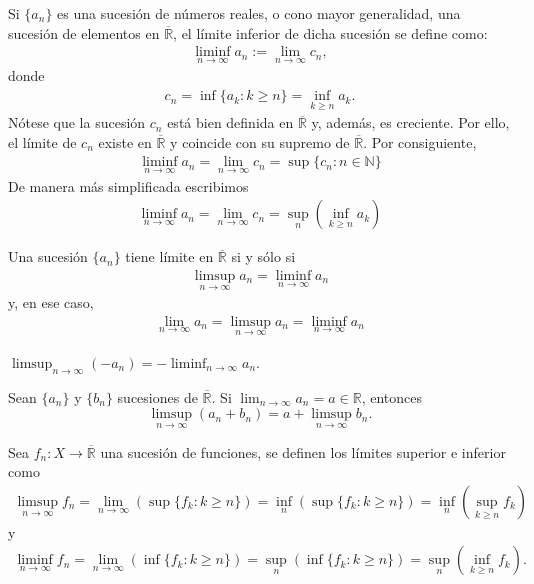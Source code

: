 \begin{defi}
    Si $\{a_n\}$ es una sucesión de números reales, o cono mayor generalidad, una sucesión de elementos en $\overline{\mathbb{R}}$, el límite inferior de dicha sucesión se define como:
    \begin{align*}
        \liminf_{n \to \infty}{a_n} := \lim_{n \to \infty}{c_n},
    \end{align*}
    donde
    \begin{align*}
        c_n = \inf{\{ a_k : k \ge n\}} = \inf_{k \ge n}{a_k}.
    \end{align*}
    Nótese que la sucesión $c_n$ está bien definida en $\overline{\mathbb{R}}$ y, además, es creciente. Por ello, el límite de $c_n$ existe en $\overline{\mathbb{R}}$ y coincide con su supremo de $\overline{\mathbb{R}}$. Por consiguiente,
    \begin{align*}
        \liminf_{n \to \infty}{a_n} = \lim_{n \to \infty}{c_n} = \sup{\{ c_n : n \in \mathbb{N}\}}
    \end{align*}
    De manera más simplificada escribimos
    \begin{align*}
        \liminf_{n \to \infty}{a_n} = \lim_{n \to \infty}{c_n} = \sup_n{(\inf_{k \ge n}{a_k})}
    \end{align*}
\end{defi}

\begin{prop}
    Una sucesión $\{ a_n \}$ tiene límite en $\overline{\mathbb{R}}$ si y sólo si
    \begin{align*}
        \limsup_{n \to \infty}{a_n} = \liminf_{n \to \infty}{a_n}
    \end{align*}
    y, en ese caso,
    \begin{align*}
        \lim_{n \to \infty}{a_n} = \limsup_{n \to \infty}{a_n} = \liminf_{n \to \infty}{a_n}
    \end{align*}
\end{prop}

\begin{obs}
    $\limsup_{n \to \infty}{(-a_n)} = -\liminf_{n \to \infty}{a_n}$.
\end{obs}
\begin{prop}
    Sean $\{ a_n\}$ y $\{ b_n \}$ sucesiones de $\overline{\mathbb{R}}$. Si $\lim_{n \to \infty}{a_n} = a \in \mathbb{R}$, entonces
    $$
        \limsup_{n \to \infty}{(a_n + b_n)} = a + \limsup_{n \to \infty}{b_n}.
    $$
\end{prop}

\begin{defi}
    Sea $f_n: X \longrightarrow \overline{\mathbb{R}}$ una sucesión de funciones, se definen los límites superior e inferior como
    \begin{align*}
        \limsup_{n \to \infty}{f_n} = \lim_{n \to \infty}{(\sup\{ f_k : k \ge n \})} = \inf_n(\sup\{ f_k : k \ge n\}) = \inf_n(\sup_{k \ge n}{f_k})
    \end{align*}
    y
    \begin{align*}
        \liminf_{n \to \infty}{f_n} = \lim_{n \to \infty}{(\inf \{ f_k : k \ge n \})} = \sup_n(\inf\{ f_k : k \ge n\}) = \sup_n(\inf_{k \ge n}{f_k}).
    \end{align*}
\end{defi}

